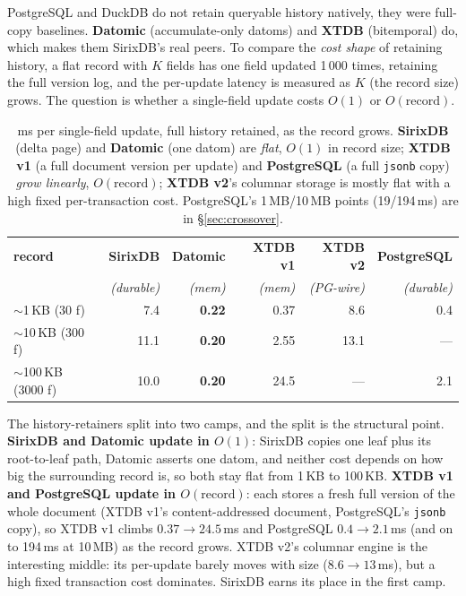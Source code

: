 \documentclass[11pt,a4paper,oneside]{report}
\theoremstyle{sirixthm}
\newcommand{\code}[1]{\texttt{#1}}
\begin{document}
PostgreSQL and DuckDB do not retain queryable history natively, they were full-copy baselines.
\textbf{Datomic} (accumulate-only datoms) and \textbf{XTDB} (bitemporal) do, which makes them SirixDB's
real peers. To compare the \emph{cost shape} of retaining history, a flat record with $K$ fields has one
field updated 1\,000 times, retaining the full version log, and the per-update latency is measured as $K$
(the record size) grows. The question is whether a single-field update costs $O(1)$ or $O(\text{record})$.

\begin{table}[h]
\centering\footnotesize\setlength{\tabcolsep}{5pt}\renewcommand{\arraystretch}{1.25}
\begin{tabular}{@{}l r r r r r@{}}
\toprule
\textbf{record} & \textbf{SirixDB} & \textbf{Datomic} & \textbf{XTDB v1} & \textbf{XTDB v2} & \textbf{PostgreSQL}\\
 & \emph{(durable)} & \emph{(mem)} & \emph{(mem)} & \emph{(PG-wire)} & \emph{(durable)}\\
\midrule
$\sim$1\,KB (30 f) & 7.4 & \textbf{0.22} & 0.37 & 8.6 & 0.4\\
$\sim$10\,KB (300 f) & 11.1 & \textbf{0.20} & 2.55 & 13.1 & ---\\
$\sim$100\,KB (3000 f) & 10.0 & \textbf{0.20} & 24.5 & --- & 2.1\\
\bottomrule
\end{tabular}
\caption{ms per single-field update, full history retained, as the record grows. \textbf{SirixDB} (delta
page) and \textbf{Datomic} (one datom) are \emph{flat}, $O(1)$ in record size; \textbf{XTDB v1} (a full
document version per update) and \textbf{PostgreSQL} (a full \code{jsonb} copy) \emph{grow linearly},
$O(\text{record})$; \textbf{XTDB v2}'s columnar storage is mostly flat with a high fixed per-transaction
cost. PostgreSQL's 1\,MB/10\,MB points (19/194\,ms) are in \S\ref{sec:crossover}.}
\label{tab:retainers}
\end{table}

The history-retainers split into two camps, and the split is the structural point. \textbf{SirixDB and
Datomic update in $O(1)$}: SirixDB copies one leaf plus its root-to-leaf path, Datomic asserts one datom,
and neither cost depends on how big the surrounding record is, so both stay flat from 1\,KB to 100\,KB.
\textbf{XTDB v1 and PostgreSQL update in $O(\text{record})$}: each stores a fresh full version of the
whole document (XTDB v1's content-addressed document, PostgreSQL's \code{jsonb} copy), so XTDB v1 climbs
$0.37\to24.5$\,ms and PostgreSQL $0.4\to2.1$\,ms (and on to 194\,ms at 10\,MB) as the record grows. XTDB
v2's columnar engine is the interesting middle: its per-update barely moves with size ($8.6\to13$\,ms),
but a high fixed transaction cost dominates. SirixDB earns its place in the first camp.
\end{document}
